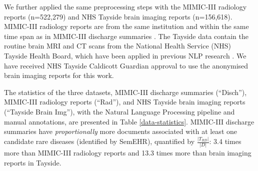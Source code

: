 \documentclass[twocolumn]{bmcart}
\begin{document}
We further applied the same preprocessing steps with the MIMIC-III radiology reports (n=522,279) and NHS Tayside brain imaging reports (n=156,618). MIMIC-III radiology reports are from the same institution and within the same time span as in MIMIC-III discharge summaries \cite{johnson_mimic-iii_2016}. The Tayside data contain the routine brain MRI and CT scans from the National Health Service (NHS) Tayside Health Board, which have been applied in previous NLP research \cite{gorinski_named_2019,sykes2021}. We have received NHS Tayside Caldicott Guardian approval to use the anonymised brain imaging reports for this work. 

The statistics of the three datasets, MIMIC-III discharge summaries (``Disch''), MIMIC-III radiology reports (``Rad''), and NHS Tayside brain imaging reports (``Tayside Brain Img''), with the Natural Language Processing pipeline and manual annotations, are presented in Table \ref{data-statistics}. MIMIC-III discharge summaries have \emph{proportionally} more documents associated with at least one candidate rare diseases (identified by SemEHR), quantified by $\frac{|T_{RD}|}{|D|}$: 3.4 times more than MIMIC-III radiology reports and 13.3 times more than brain imaging reports in Tayside.
\end{document}
